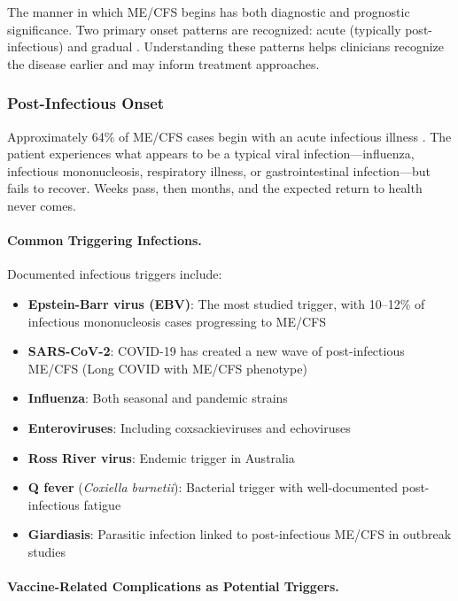 
The manner in which ME/CFS begins has both diagnostic and prognostic significance. Two primary onset patterns are recognized: acute (typically post-infectious) and gradual \cite{Jason2019onset}. Understanding these patterns helps clinicians recognize the disease earlier and may inform treatment approaches.

\subsubsection{Post-Infectious Onset}

Approximately 64\% of ME/CFS cases begin with an acute infectious illness \cite{Jason2019onset}. The patient experiences what appears to be a typical viral infection---influenza, infectious mononucleosis, respiratory illness, or gastrointestinal infection---but fails to recover. Weeks pass, then months, and the expected return to health never comes.

\paragraph{Common Triggering Infections.}
Documented infectious triggers include:
\begin{itemize}
    \item \textbf{Epstein-Barr virus (EBV)}: The most studied trigger, with 10--12\% of infectious mononucleosis cases progressing to ME/CFS
    \item \textbf{SARS-CoV-2}: COVID-19 has created a new wave of post-infectious ME/CFS (Long COVID with ME/CFS phenotype)
    \item \textbf{Influenza}: Both seasonal and pandemic strains
    \item \textbf{Enteroviruses}: Including coxsackieviruses and echoviruses
    \item \textbf{Ross River virus}: Endemic trigger in Australia
    \item \textbf{Q fever} (\textit{Coxiella burnetii}): Bacterial trigger with well-documented post-infectious fatigue
    \item \textbf{Giardiasis}: Parasitic infection linked to post-infectious ME/CFS in outbreak studies
\end{itemize}

\paragraph{Vaccine-Related Complications as Potential Triggers.}

